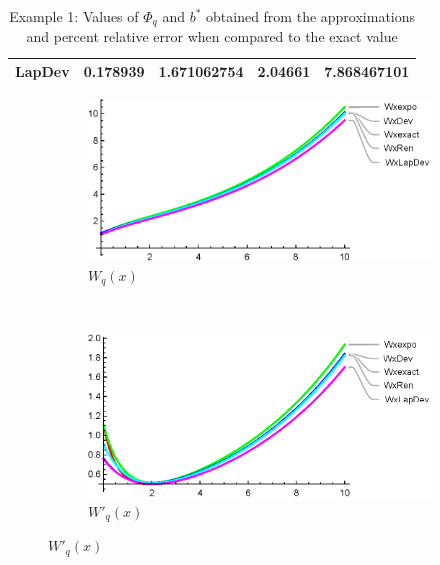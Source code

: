 \begin{table}
\begin{tabular}{|l|l|l|l|l|}
LapDev & 0.178939                                                              & 1.671062754                                                                 & 2.04661                                                      & 7.868467101                                                             \\ \hline
\end{tabular}
\caption{Example 1: Values of $\Phi_q$ and $b^*$ obtained from the approximations and percent relative error when compared to the exact value}
\label{table:sample1}
\end{table}


\begin{figure}
    \centering
    \begin{subfigure}[b]{0.4\textwidth}
        \includegraphics[width=\textwidth]{Wsample1}
        \caption{$W_q(x)$}
        \label{fig:Wsample1}
    \end{subfigure}
    ~ %
    \begin{subfigure}[b]{0.4\textwidth}
        \includegraphics[width=\textwidth]{W1sample1}
        \caption{$W'_q(x)$}
        \label{fig:W1sample1}
    \end{subfigure}

\end{figure}
